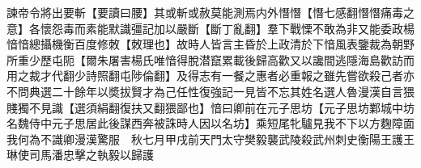 諫帝令將出要斬【要讀曰腰】其或斬或赦莫能測焉内外憯憯【憯七感翻憯憯痛毒之意】各懷怨毒而素能默識彊記加以嚴斷【斷丁亂翻】羣下戰慄不敢為非又能委政楊愔愔總攝機衡百度修敇【敇理也】故時人皆言主昏於上政清於下愔風表鑒裁為朝野所重少歷屯阨【爾朱屠害楊氏唯愔得脫潜竄累載後歸高歡又以讒間逃隱海島歡訪而用之裁才代翻少詩照翻屯陟倫翻】及得志有一餐之惠者必重報之雖先嘗欲殺己者亦不問典選二十餘年以奬拔賢才為己任性復強記一見皆不忘其姓名選人魯漫漢自言猥賤獨不見識【選須絹翻復扶又翻猥鄙也】愔曰卿前在元子思坊【元子思坊鄴城中坊名魏侍中元子思居此後謀西奔被誅時人因以名坊】乘短尾牝驢見我不下以方麴障面我何為不識卿漫漢驚服　秋七月甲戌前天門太守樊毅襲武陵殺武州刺史衡陽王護王琳使司馬潘忠擊之執毅以歸護